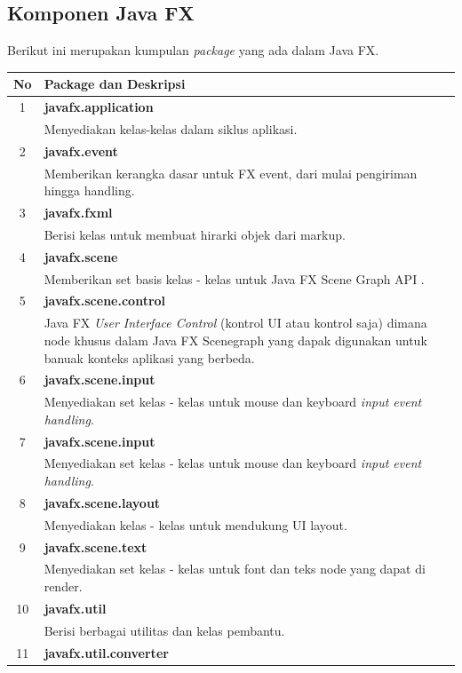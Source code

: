 \subsection{Komponen Java FX}
Berikut ini merupakan kumpulan \textit{package} yang ada dalam Java FX\cite{javafx3}.\\
	\begin{tabular}{|c|p{12cm}|}
		\hline
		\textbf{No} & \textbf{Package dan Deskripsi} \\ \hline \hline
		1 & \textbf{javafx.application}\\
			&	Menyediakan kelas-kelas dalam siklus aplikasi.\\ \hline
		2 & \textbf{javafx.event}\\
			&	Memberikan kerangka dasar untuk FX event, dari mulai pengiriman hingga handling.\\ \hline	
		3 & \textbf{javafx.fxml}\\
			&	Berisi kelas untuk membuat hirarki objek dari markup.\\ \hline
		4 & \textbf{javafx.scene}\\
			&	Memberikan set basis kelas - kelas untuk Java FX Scene Graph API .\\ \hline
		5 & \textbf{javafx.scene.control}\\
			&	Java FX \textit{User Interface Control }(kontrol UI atau kontrol saja) dimana node khusus dalam Java FX Scenegraph yang dapak digunakan untuk banuak konteks aplikasi yang berbeda.\\ \hline
		6 & \textbf{javafx.scene.input}\\
			&	Menyediakan set kelas - kelas untuk mouse dan keyboard \textit{input event handling}.\\ \hline
		7 & \textbf{javafx.scene.input}\\
			&	Menyediakan set kelas - kelas untuk mouse dan keyboard \textit{input event handling}.\\ \hline
		8 & \textbf{javafx.scene.layout}\\
			&	Menyediakan kelas - kelas untuk mendukung UI layout.\\ \hline
		9 & \textbf{javafx.scene.text}\\
			&	Menyediakan set kelas - kelas untuk font dan teks node yang dapat di render.\\ \hline
		10 & \textbf{javafx.util}\\
			&	Berisi berbagai utilitas dan kelas pembantu.\\ \hline
		11 & \textbf{javafx.util.converter}\\

\end{tabular}
